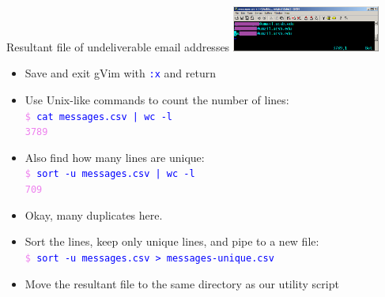 \documentclass[professionalfont,10pt]{beamer}
\begin{document}
\begin{frame}{Resultant file of undeliverable email addresses}
\includegraphics[height=1.5cm]{vim-csv-4.png}
\vspace{0.25cm}
\begin{itemize}
\item Save and exit gVim with \textcolor{blue}{\texttt{:x}} and return
\item Use Unix-like commands to count the number of lines:\\
\texttt{\textcolor{violet}{\$} \textcolor{blue}{cat messages.csv | wc -l}} \\
\textcolor{violet}{\texttt{3789}}
\item Also find how many lines are unique:\\
\texttt{\textcolor{violet}{\$} \textcolor{blue}{sort -u messages.csv | wc -l}}\\
\textcolor{violet}{\texttt{709}}
\item Okay, many duplicates here.
\item Sort the lines, keep only unique lines, and pipe to a new file:\\
\texttt{\textcolor{violet}{\$} \textcolor{blue}{sort -u messages.csv > messages-unique.csv}}
\item Move the resultant file to the same directory as our utility script
\end{itemize}
\end{frame}
\end{document}
